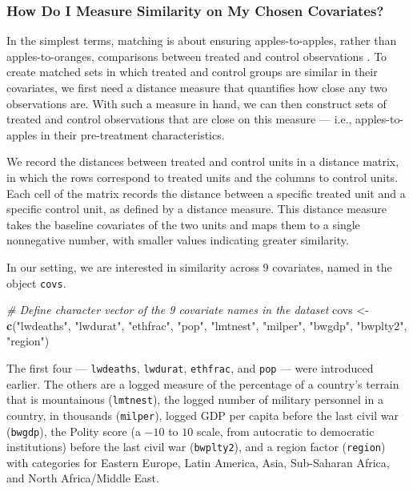 \documentclass[
  12pt,
  leqno]{article}
\newenvironment{Shaded}{\begin{snugshade}}{\end{snugshade}}
\newcommand{\CommentTok}[1]{\textcolor[rgb]{0.56,0.35,0.01}{\textit{#1}}}
\newcommand{\FunctionTok}[1]{\textcolor[rgb]{0.13,0.29,0.53}{\textbf{#1}}}
\newcommand{\NormalTok}[1]{#1}
\newcommand{\OtherTok}[1]{\textcolor[rgb]{0.56,0.35,0.01}{#1}}
\newcommand{\StringTok}[1]{\textcolor[rgb]{0.31,0.60,0.02}{#1}}
\begin{document}
\subsubsection{How Do I Measure Similarity on My Chosen
Covariates?}\label{how-do-i-measure-similarity-on-my-chosen-covariates}

In the simplest terms, matching is about ensuring apples-to-apples,
rather than apples-to-oranges, comparisons between treated and control
observations \citep[see][]{rubinwaterman2006}. To create matched sets in
which treated and control groups are similar in their covariates, we
first need a distance measure that quantifies how close any two
observations are. With such a measure in hand, we can then construct
sets of treated and control observations that are close on this measure
--- i.e., apples-to-apples in their pre-treatment characteristics.

We record the distances between treated and control units in a distance
matrix, in which the rows correspond to treated units and the columns to
control units. Each cell of the matrix records the distance between a
specific treated unit and a specific control unit, as defined by a
distance measure. This distance measure takes the baseline covariates of
the two units and maps them to a single nonnegative number, with smaller
values indicating greater similarity.

In our setting, we are interested in similarity across \(9\) covariates,
named in the object \texttt{covs}.

\singlespacing

\begin{Shaded}
\begin{Highlighting}[]
\CommentTok{\# Define character vector of the 9 covariate names in the dataset}
\NormalTok{covs }\OtherTok{\textless{}{-}} \FunctionTok{c}\NormalTok{(}\StringTok{"lwdeaths"}\NormalTok{, }\StringTok{"lwdurat"}\NormalTok{, }\StringTok{"ethfrac"}\NormalTok{, }\StringTok{"pop"}\NormalTok{, }\StringTok{"lmtnest"}\NormalTok{, }\StringTok{"milper"}\NormalTok{,}
          \StringTok{"bwgdp"}\NormalTok{, }\StringTok{"bwplty2"}\NormalTok{, }\StringTok{"region"}\NormalTok{)}
\end{Highlighting}
\end{Shaded}

\doublespacing

The first four --- \texttt{lwdeaths}, \texttt{lwdurat},
\texttt{ethfrac}, and \texttt{pop} --- were introduced earlier. The
others are a logged measure of the percentage of a country's terrain
that is mountainous (\texttt{lmtnest}), the logged number of military
personnel in a country, in thousands (\texttt{milper}), logged GDP per
capita before the last civil war (\texttt{bwgdp}), the Polity score (a
\(-10\) to \(10\) scale, from autocratic to democratic institutions)
before the last civil war (\texttt{bwplty2}), and a region factor
(\texttt{region}) with categories for Eastern Europe, Latin America,
Asia, Sub-Saharan Africa, and North Africa/Middle East.
\end{document}
